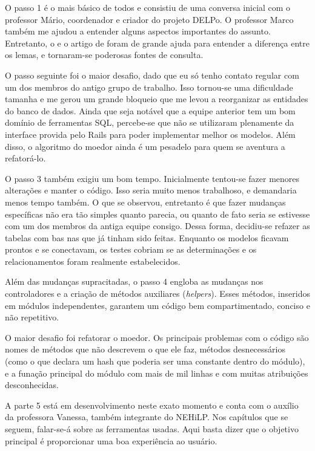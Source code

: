 O passo 1 é o mais básico de todos e consistiu de uma conversa inicial com o professor Mário, coordenador e criador do
projeto DELPo. O professor Marco também me ajudou a entender alguns aspectos importantes do assunto. Entretanto, o
 e o artigo de \cite{Mar:17} foram de grande ajuda para entender a diferença entre os lemas, e tornaram-se
poderosas fontes de consulta.

O passo seguinte foi o maior desafio, dado que eu só tenho contato regular com um dos membros
do antigo grupo de trabalho. Isso tornou-se uma dificuldade tamanha e me gerou um grande bloqueio
que me levou a reorganizar as entidades do banco de dados. Ainda que seja notável que a equipe
anterior tem um bom domínio de ferramentas SQL, percebe-se que não se utilizaram plenamente da
interface provida pelo Rails para poder implementar melhor os modelos. Além disso, o algoritmo
do moedor ainda é um pesadelo para quem se aventura a refatorá-lo.

O passo 3 também exigiu um bom tempo. Inicialmente tentou-se fazer menores alterações e manter
o código. Isso seria muito menos trabalhoso, e demandaria menos tempo também. O que se observou,
entretanto é que fazer mudanças específicas não era tão simples quanto parecia, ou quanto de fato
seria se estivesse com um dos membros da antiga equipe consigo. Dessa forma, decidiu-se refazer as
tabelas com bas nas que já tinham sido feitas. Enquanto os modelos ficavam prontos e se conectavam,
os testes cobriam se as determinações e os relacionamentos foram realmente estabelecidos.

Além das mudanças supracitadas, o passo 4 engloba as mudanças nos controladores e a criação de métodos
auxiliares (\emph{helpers}). Esses métodos, inseridos em módulos independentes, garantem um código bem
compartimentado, conciso e não repetitivo.

O maior desafio foi refatorar o moedor. Os principais problemas com o código são nomes de métodos que
não descrevem o que ele faz, métodos desnecessários (como o que declara um hash que poderia ser uma
constante dentro do módulo), e a funação principal do módulo com mais de mil linhas e com muitas
atribuições desconhecidas.

A parte 5 está em desenvolvimento neste exato momento e conta com o auxílio da professora Vanessa,
também integrante do NEHiLP. Nos capítulos que se seguem, falar-se-á sobre as ferramentas usadas.
Aqui basta dizer que o objetivo principal é proporcionar uma boa experiência ao usuário.

